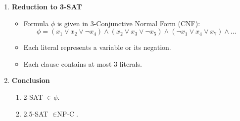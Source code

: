 \begin{example}
\begin{enumerate}
    \item \textbf{Reduction to 3-SAT}

    \begin{itemize}
        \item Formula \(\phi\) is given in 3-Conjunctive Normal Form (CNF):
        \[
        \phi = (x_1 \lor x_2 \lor \lnot x_4) \land (x_2 \lor x_3 \lor \lnot x_5) \land (\lnot x_1 \lor x_4 \lor x_7) \land \ldots
        \]
        \item Each literal represents a variable or its negation.
        \item Each clause contains at most 3 literals.
    \end{itemize}

    \item \textbf{Conclusion}
    \begin{enumerate}
        \item 2-SAT \(\in \phi\).
        \item 2.5-SAT \(\in \text{NP-C}\).
    \end{enumerate}
    \end{enumerate}
\end{example}